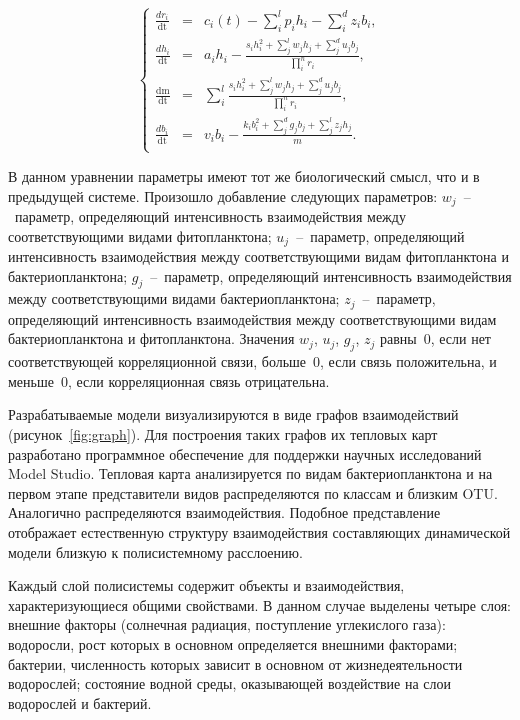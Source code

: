 \documentclass[a4paper,12pt,openany,final]{extreport}
\begin{document}
\begin{equation}
 \left\{ \begin{array}{lcl}
\frac{dr_{i}}{\text{dt}} &=& c_{i}\left( t \right) - \sum_{i}^{l}{p_{i}h_{i}} - \sum_{i}^{d}{z_{i}b_{i}},\\
\frac{dh_{i}}{\text{dt}} &=& a_{i}h_{i} - \frac{s_{i}h_{i}^{2} + \sum_{j}^{l}{w_{j}h_{j} + \sum_{j}^{d}{u_{j}b_{j}}}}{\prod_{i}^{n}r_{i}},\\
\frac{\text{dm}}{\text{dt}} &=& \sum_{i}^{l}\frac{s_{i}h_{i}^{2} + \sum_{j}^{l}{w_{j}h_{j} + \sum_{j}^{d}{u_{j}b_{j}}}}{\prod_{i}^{n}r_{i}},\\
\frac{db_{i}}{\text{dt}} &=& v_{i}b_{i} - \frac{k_{i}b_{i}^{2} + \sum_{j}^{d}{g_{j}b_{j} + \sum_{j}^{l}{z_{j}h_{j}}}}{m}.\\
\end{array} \right.
  \label{eq:four-comp-sys-spec}
\end{equation}

В данном уравнении параметры имеют тот же биологический смысл, что и в предыдущей системе. Произошло добавление следующих параметров: \(w_{j}\)~--~параметр, определяющий интенсивность взаимодействия между соответствующими видами фитопланктона; \(u_{j}\)~--~параметр, определяющий интенсивность взаимодействия между соответствующими видам фитопланктона и бактериопланктона; \(g_{j}\)~--~параметр, определяющий интенсивность взаимодействия между соответствующими видами бактериопланктона; \(z_{j}\)~--~параметр, определяющий интенсивность взаимодействия между соответствующими видам бактериопланктона и фитопланктона. Значения \(w_{j}\), \(u_{j}\), \(g_{j}\), \(z_{j}\) равны~0, если нет соответствующей корреляционной связи, больше~0, если связь положительна, и меньше~0, если корреляционная связь отрицательна.

Разрабатываемые модели визуализируются в виде графов взаимодействий (рисунок~\ref{fig:graph}). Для построения таких графов их тепловых карт разработано программное обеспечение для поддержки научных исследований Model Studio.  Тепловая карта анализируется по видам бактериопланктона и на первом этапе представители видов распределяются по классам и близким OTU. Аналогично распределяются взаимодействия. Подобное представление отображает естественную структуру взаимодействия составляющих динамической модели близкую к полисистемному расслоению.

Каждый слой полисистемы содержит объекты и взаимодействия, характеризующиеся общими свойствами. В данном случае выделены четыре слоя: внешние факторы (солнечная радиация, поступление углекислого газа): водоросли, рост которых в основном определяется внешними факторами; бактерии, численность которых зависит в основном от жизнедеятельности водорослей; состояние водной среды, оказывающей воздействие на слои водорослей и бактерий.
\end{document}
